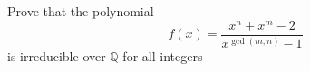 Prove that the polynomial
\[ f(x) = \frac {x^n + x^m - 2}{x^{\gcd(m,n)} - 1}\]
is irreducible over $ \mathbb{Q}$ for all integers 